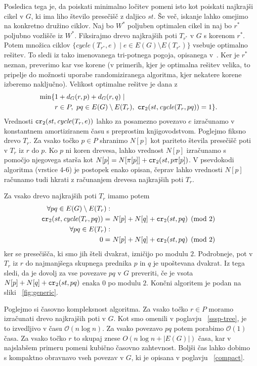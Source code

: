 \documentclass[a4paper, 12pt]{book}
\newcommand{\OO}{\ensuremath{\mathcal{O}}} %
\newcommand{\cycle}{\mathit{cycle}}
\newcommand\CR{\mbox{\tt cr}_2}		  %
\begin{document}
Posledica tega je, da poiskati minimalno ločitev pomeni isto kot poiskati najkrajši cikel v $G$, ki ima liho število presečišč z daljico $st$. Še več, iskanje lahko omejimo na konkretno družino ciklov. Naj bo $W^*$ poljuben optimalen cikel in naj bo $r^*$ poljubno vozlišče iz $W^*$. Fiksirajmo drevo najkrajših poti $T_{r^*}$ v $G$ s korenom $r^*$. Potem množica ciklov $\{ \cycle(T_{r^*},e)\mid e\in E(G)\setminus E(T_{r^*})\}$ vsebuje optimalno rešitev. To sledi iz tako imenovanega tri-potnega pogoja, opisanega v~\cite{CG16}. Ker   je $r^*$ neznan, preverimo kar vse korene (v primerih, kjer je optimalna rešitev velika, to pripelje do možnosti uporabe randomiziranega algoritma, kjer nekatere korene izberemo naključno). Velikost optimalne rešitve je dana z
\begin{align*}
\min \{& 1+d_G(r,p)+d_G(r,q) \mid \\
	   & r\in P,~ pq\in E(G)\setminus E(T_r),~
		\CR(st,\cycle(T_{r},pq))=1 \} .
\end{align*}
Vrednosti $\CR (st, \cycle(T_r,e))$ lahko za posamezno povezavo $e$ izračunamo v konstantnem amortiziranem času s preprostim knjigovodstvom.  Poglejmo fiksno drevo $T_r$. Za vsako točko $p\in P$ shranimo $N[p]$ kot pariteto števila presečišč poti v $T_r$ iz $r$ do $p$. Ko $p$ ni koren drevesa, lahko vrednost $N[p]$ izračunamo s pomočjo njegovega starša kot $N[p]=N[\pi[p]]+\CR(st,p\pi[p])$. V psevdokodi algoritma (vrstice 4-6) je  postopek enako opisan, čeprav lahko vrednosti $N[p]$ računamo tudi hkrati z računanjem drevesa najkrajših poti $T_r$.

Za vsako drevo najkrajših poti $T_r$ imamo potem 
\begin{align*}
	\forall pq\in E(G)\setminus E(T_r):&\\
	\CR (st, \cycle(T_r,pq)) =&~N[p]+N[q]+\CR(st,pq) \pmod 2\\
	\forall pq\in E(T_r):&\\
	0 =&~N[p]+N[q]+\CR(st,pq) \pmod 2
\end{align*}
ker se presečišča, ki smo jih šteli dvakrat, izničijo po modulu $2$. Podrobneje, pot v $T_r$ iz $r$ do najmanjšega skupnega prednika $p$ in $q$ je upoštevana dvakrat. Iz tega sledi, da je dovolj za vse povezave $pq$ v $G$ preveriti, če je vsota $N[p]+N[q]+\CR(st,pq)$ enaka $0$ po modulu $2$. Končni algoritem je podan na sliki ~\ref{fig:generic}.

Poglejmo si časovno kompleksnost algoritma. Za vsako točko $r\in P$ moramo izračunati drevo najkrajših poti v $G$. Kot smo omenili v poglavju ~\ref{sssp-tree}, je to izvedljivo v času $\OO(n\log n)$. Za vsako povezavo $pq$ potem porabimo $\OO(1)$ časa. Za vsako točko $r$ to skupaj znese $O(n\log n+|E(G)|)$ časa, kar v najslabšem primeru pomeni kubično časovno zahtevnost. Boljši čas lahko dobimo s kompaktno obravnavo vseh povezav v $G$, ki je opisana v poglavju ~\ref{compact}.  
\end{document}
